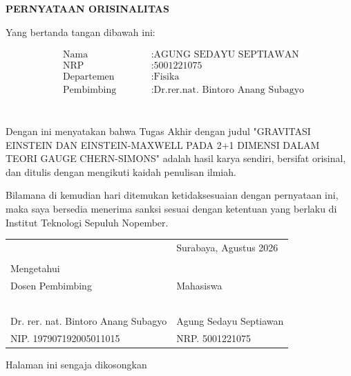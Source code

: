 \begin{center}
    \large
    \textbf{PERNYATAAN ORISINALITAS}
\end{center}

\vspace{2ex}

\noindent Yang bertanda tangan dibawah ini:

\begin{minipage}{\textwidth}
    \begin{align*}
        &\text{Nama} \qquad &&: \text{AGUNG SEDAYU SEPTIAWAN} \\
        &\text{NRP} \qquad &&: \text{5001221075} \\
        &\text{Departemen} \qquad &&: \text{Fisika} \\
        &\text{Pembimbing} \qquad &&: \text{Dr.rer.nat. Bintoro Anang Subagyo} \\
    \end{align*}
\end{minipage} \\

Dengan ini menyatakan bahwa Tugas Akhir dengan judul "GRAVITASI EINSTEIN DAN EINSTEIN-MAXWELL PADA 2+1 DIMENSI DALAM TEORI GAUGE CHERN-SIMONS" adalah hasil karya sendiri, bersifat orisinal, dan ditulis dengan mengikuti kaidah penulisan ilmiah.

Bilamana di kemudian hari ditemukan ketidaksesuaian dengan pernyataan ini, maka saya bersedia menerima sanksi sesuai dengan ketentuan yang berlaku di Institut Teknologi Sepuluh Nopember.

\vspace{8ex}

\noindent\begin{tabularx}{\textwidth}{X l}
    & Surabaya, Agustus 2026\\
    & \\
    Mengetahui & \\
    Dosen Pembimbing & Mahasiswa\\
    & \\
    & \\
    & \\
    & \\
    & \\
    Dr. rer. nat. Bintoro Anang Subagyo & Agung Sedayu Septiawan \\
    NIP. 197907192005011015 & NRP. 5001221075\\
\end{tabularx}

\newpage
\thispagestyle{empty}
\vspace*{\fill}
    \begin{center}
    Halaman ini sengaja dikosongkan
    \end{center}
\vspace*{\fill}
\pagebreak